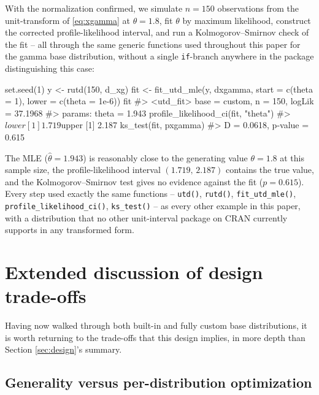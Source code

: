 With the normalization confirmed, we simulate $n=150$ observations from
the unit-transform of \eqref{eq:xgamma} at $\theta=1.8$, fit
$\theta$ by maximum likelihood, construct the corrected
profile-likelihood interval, and run a Kolmogorov--Smirnov check of the
fit -- all through the same generic functions used throughout this
paper for the gamma base distribution, without a single
\texttt{if}-branch anywhere in the package distinguishing this case:

\begin{example}
set.seed(1)
y <- rutd(150, d_xg)
fit <- fit_utd_mle(y, dxgamma, start = c(theta = 1), lower = c(theta = 1e-6))
fit
#> <utd_fit> base = custom, n = 150, logLik = 37.1968
#> params: theta = 1.943
profile_likelihood_ci(fit, "theta")
#> $lower [1] 1.719   $upper [1] 2.187
ks_test(fit, pxgamma)
#> D = 0.0618, p-value = 0.615
\end{example}

The MLE ($\hat\theta=1.943$) is reasonably close to the generating value
$\theta=1.8$ at this sample size, the profile-likelihood interval
$(1.719,\,2.187)$ contains the true value, and the Kolmogorov--Smirnov
test gives no evidence against the fit ($p=0.615$). Every step used
exactly the same functions -- \texttt{utd()}, \texttt{rutd()},
\texttt{fit\_utd\_mle()}, \texttt{profile\_likelihood\_ci()},
\texttt{ks\_test()} -- as every other example in this paper, with a
distribution that no other unit-interval package on CRAN currently
supports in any transformed form.

\section{Extended discussion of design trade-offs}
\label{sec:tradeoffs}

Having now walked through both built-in and fully custom base
distributions, it is worth returning to the trade-offs that this design
implies, in more depth than Section \ref{sec:design}'s summary.

\subsection{Generality versus per-distribution optimization}

